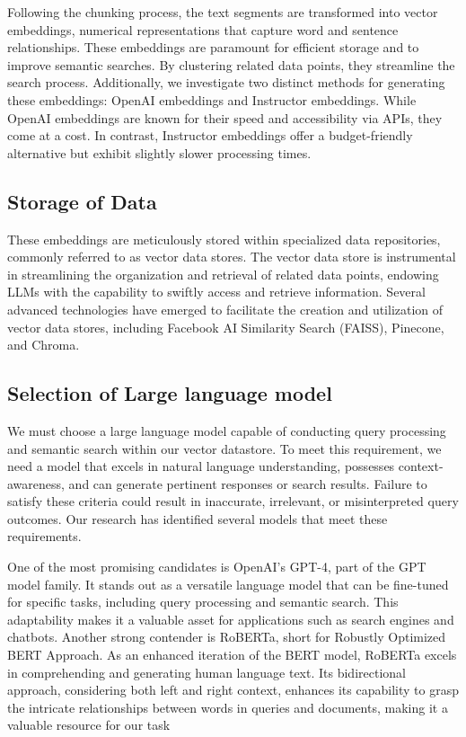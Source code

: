 \documentclass[conference]{IEEEtran}
\begin{document}
Following the chunking process, the text segments are transformed into vector embeddings, numerical representations that capture word and sentence relationships. These embeddings are paramount for efficient storage and to improve semantic searches. By clustering related data points, they streamline the search process. Additionally, we investigate two distinct methods for generating these embeddings: OpenAI embeddings and Instructor embeddings. While OpenAI embeddings are known for their speed and accessibility via APIs, they come at a cost. In contrast, Instructor embeddings offer a budget-friendly alternative but exhibit slightly slower processing times.

\subsection{Storage of Data}

These embeddings are meticulously stored within specialized data repositories, commonly referred to as vector data stores. The vector data store is instrumental in streamlining the organization and retrieval of related data points, endowing LLMs with the capability to swiftly access and retrieve information. Several advanced technologies have emerged to facilitate the creation and utilization of vector data stores, including Facebook AI Similarity Search (FAISS), Pinecone, and Chroma. 

\subsection{Selection of Large language model}
We must choose a large language model capable of conducting query processing and semantic search within our vector datastore. To meet this requirement, we need a model that excels in natural language understanding, possesses context-awareness, and can generate pertinent responses or search results. Failure to satisfy these criteria could result in inaccurate, irrelevant, or misinterpreted query outcomes. Our research has identified several models that meet these requirements.

One of the most promising candidates is OpenAI's GPT-4, part of the GPT model family. It stands out as a versatile language model that can be fine-tuned for specific tasks, including query processing and semantic search. This adaptability makes it a valuable asset for applications such as search engines and chatbots. Another strong contender is RoBERTa, short for Robustly Optimized BERT Approach. As an enhanced iteration of the BERT model, RoBERTa excels in comprehending and generating human language text. Its bidirectional approach, considering both left and right context, enhances its capability to grasp the intricate relationships between words in queries and documents, making it a valuable resource for our task
\end{document}
